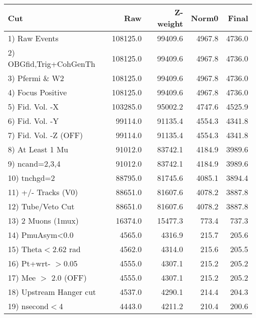  \begin{table}[h!]\centering
 \begin{tabular}{||l||r|r|r|r||}
 \hline
 \hline
 Cut & Raw & Z-weight & Norm0 & Final \\
 \hline
  1) Raw Events           &    108125.0 &     99409.6 &      4967.8 &      4736.0 \\
  2) OBGfid,Trig+CohGenTh &    108125.0 &     99409.6 &      4967.8 &      4736.0 \\
  3) Pfermi \& W2         &    108125.0 &     99409.6 &      4967.8 &      4736.0 \\
  4) Focus Positive       &    108125.0 &     99409.6 &      4967.8 &      4736.0 \\
  5) Fid. Vol. -X         &    103285.0 &     95002.2 &      4747.6 &      4525.9 \\
  6) Fid. Vol. -Y         &     99114.0 &     91135.4 &      4554.3 &      4341.8 \\
  7) Fid. Vol. -Z (OFF)   &     99114.0 &     91135.4 &      4554.3 &      4341.8 \\
  8) At Least 1 Mu        &     91012.0 &     83742.1 &      4184.9 &      3989.6 \\
  9) ncand=2,3,4          &     91012.0 &     83742.1 &      4184.9 &      3989.6 \\
 10) tnchgd=2             &     88795.0 &     81745.6 &      4085.1 &      3894.4 \\
 11) +/- Tracks (V0)      &     88651.0 &     81607.6 &      4078.2 &      3887.8 \\
 12) Tube/Veto Cut        &     88651.0 &     81607.6 &      4078.2 &      3887.8 \\
 13) 2 Muons (1mux)       &     16374.0 &     15477.3 &       773.4 &       737.3 \\
 14) PmuAsym<0.0          &      4565.0 &      4316.9 &       215.7 &       205.6 \\
 15) Theta$<$2.62 rad     &      4562.0 &      4314.0 &       215.6 &       205.5 \\
 16) Pt+wrt- $>$0.05      &      4555.0 &      4307.1 &       215.2 &       205.2 \\
 17) Mee $>$ 2.0  (OFF)   &      4555.0 &      4307.1 &       215.2 &       205.2 \\
 18) Upstream Hanger cut  &      4537.0 &      4290.1 &       214.4 &       204.3 \\
 19) nsecond$<$4          &      4443.0 &      4211.2 &       210.4 &       200.6 \\

\end{tabular}
\end{table}

